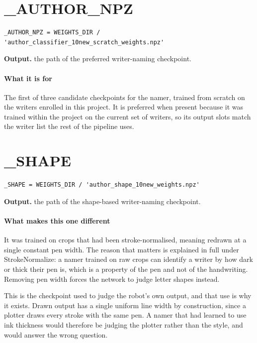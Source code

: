 \section{\_AUTHOR\_NPZ}
\begin{lstlisting}[style=sig]
_AUTHOR_NPZ = WEIGHTS_DIR / 'author_classifier_10new_scratch_weights.npz'
\end{lstlisting}

\noindent\textbf{Output.} the path of the preferred writer-naming checkpoint.


\paragraph{What it is for}
The first of three candidate checkpoints for the namer, trained from scratch on the writers enrolled in this project. It is preferred when present because it was trained within the project on the current set of writers, so its output slots match the writer list the rest of the pipeline uses.


\section{\_SHAPE}
\begin{lstlisting}[style=sig]
_SHAPE = WEIGHTS_DIR / 'author_shape_10new_weights.npz'
\end{lstlisting}

\noindent\textbf{Output.} the path of the shape-based writer-naming checkpoint.


\paragraph{What makes this one different}
It was trained on crops that had been stroke-normalised, meaning redrawn at a single constant pen width. The reason that matters is explained in full under StrokeNormalize: a namer trained on raw crops can identify a writer by how dark or thick their pen is, which is a property of the pen and not of the handwriting. Removing pen width forces the network to judge letter shapes instead.

This is the checkpoint used to judge the robot's own output, and that use is why it exists. Drawn output has a single uniform line width by construction, since a plotter draws every stroke with the same pen. A namer that had learned to use ink thickness would therefore be judging the plotter rather than the style, and would answer the wrong question.


